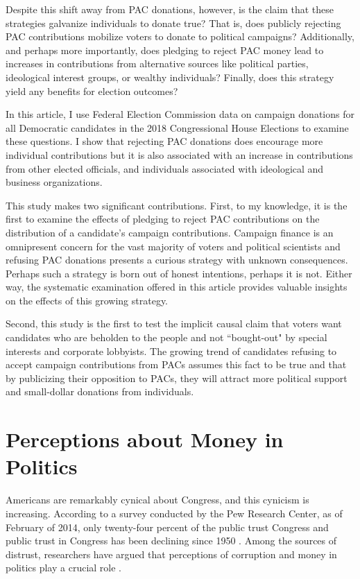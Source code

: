 \documentclass[12pt]{article}
\begin{document}
Despite this shift away from PAC donations, however, is the claim that these strategies galvanize individuals to donate true? That is, does publicly rejecting PAC contributions mobilize voters to donate to political campaigns? Additionally, and perhaps more importantly, does pledging to reject PAC money lead to increases in contributions from alternative sources like political parties, ideological interest groups, or wealthy individuals? Finally, does this strategy yield any benefits for election outcomes?

In this article, I use Federal Election Commission data on campaign donations for all Democratic candidates in the 2018 Congressional House Elections to examine these questions. I show that rejecting PAC donations does encourage more individual contributions but it is also associated with an increase in contributions from other elected officials, and individuals associated with ideological and business organizations.   

This study makes two significant contributions. First, to my knowledge, it is the first to examine the effects of pledging to reject PAC contributions on the distribution of a  candidate's campaign contributions. Campaign finance is an omnipresent concern for the vast majority of voters and political scientists and refusing PAC donations presents a curious strategy with unknown consequences. Perhaps such a strategy is born out of honest intentions, perhaps it is not. Either way, the systematic examination offered in this article provides valuable insights on the effects of this growing strategy. 

Second, this study is the first to test the implicit causal claim that voters want candidates who are beholden to the people and not ``bought-out" by special interests and corporate lobbyists. The growing trend of candidates refusing to accept campaign contributions from PACs assumes this fact to be true and that by publicizing their opposition to PACs, they will attract more political support and small-dollar donations from individuals.  


\section{Perceptions about Money in Politics}

 Americans are remarkably cynical about Congress, and this cynicism is increasing. According to a survey conducted by the Pew Research Center, as of February of 2014, only twenty-four percent of the public trust Congress \citep{pewresearchcenter2014} and public trust in Congress has been declining since 1950 \citep{dalton2005}. Among the sources of distrust, researchers have argued that perceptions of corruption and money in politics play a crucial role \citep{persily2004, vanheerde-hudson2013}. 
 
\end{document}
